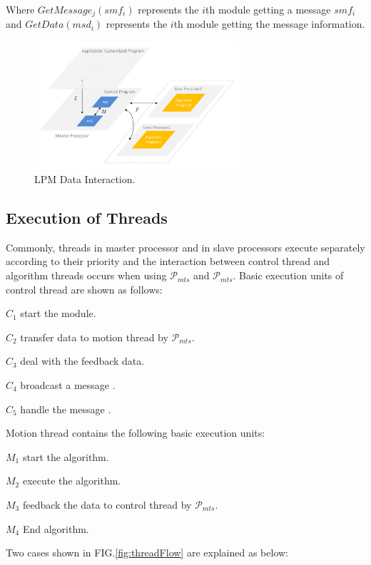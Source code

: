\documentclass[journal,UTF8]{IEEEtran}
\begin{document}
Where $GetMessage_{j}(smf_i)$ represents the $i$th module getting a message $smf_i$ and $GetData(msd_i)$ represents the $i$th module getting the message information.

 \begin{figure}
	\centering
	\includegraphics[width=3in]{fig/Interaction.pdf}
	\caption{ LPM Data Interaction.}
	\label{fig:Interaction}
\end{figure}

 \subsection{Execution of Threads}
 Commonly, threads in master processor and in slave processors execute separately according to their priority and the interaction between control thread and algorithm threads occurs when using $\mathcal{P}_{mts}$ and $\mathcal{P}_{mts}$. Basic execution units of control thread are shown as follows:
 
 \textbf{$C_{1}$} start the module.
 
 \textbf{$C_{2}$} transfer data to motion thread by $\mathcal{P}_{mts}$.
 
 \textbf{$C_{3}$} deal with the feedback data.
 
 \textbf{$C_{4}$} broadcast a message .
 
  \textbf{$C_{5}$} handle the message .
  
 Motion thread contains the following basic execution units:
 
 \textbf{$M_{1}$} start the algorithm.
 
 \textbf{$M_{2}$} execute the algorithm.
 
 \textbf{$M_{3}$} feedback the data to control thread by $\mathcal{P}_{mts}$.
 
 \textbf{$M_{4}$} End algorithm.
  
  Two cases shown in FIG.\ref{fig:threadFlow} are explained as below:
  
\end{document}
